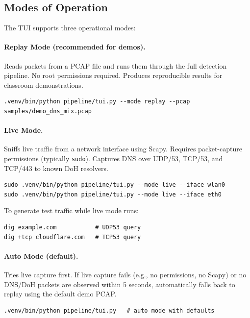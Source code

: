 \documentclass[12pt,a4paper]{article}
\begin{document}
\subsection{Modes of Operation}

The TUI supports three operational modes:

\paragraph{Replay Mode (recommended for demos).}
Reads packets from a PCAP file and runs them through the full detection pipeline. No root permissions required. Produces reproducible results for classroom demonstrations.

\begin{lstlisting}
.venv/bin/python pipeline/tui.py --mode replay --pcap samples/demo_dns_mix.pcap
\end{lstlisting}

\paragraph{Live Mode.}
Sniffs live traffic from a network interface using Scapy. Requires packet-capture permissions (typically \texttt{sudo}). Captures DNS over UDP/53, TCP/53, and TCP/443 to known DoH resolvers.

\begin{lstlisting}
sudo .venv/bin/python pipeline/tui.py --mode live --iface wlan0
sudo .venv/bin/python pipeline/tui.py --mode live --iface eth0
\end{lstlisting}

To generate test traffic while live mode runs:
\begin{lstlisting}
dig example.com           # UDP53 query
dig +tcp cloudflare.com   # TCP53 query
\end{lstlisting}

\paragraph{Auto Mode (default).}
Tries live capture first. If live capture fails (e.g., no permissions, no Scapy) or no DNS/DoH packets are observed within 5 seconds, automatically falls back to replay using the default demo PCAP.

\begin{lstlisting}
.venv/bin/python pipeline/tui.py   # auto mode with defaults
\end{lstlisting}
\end{document}
